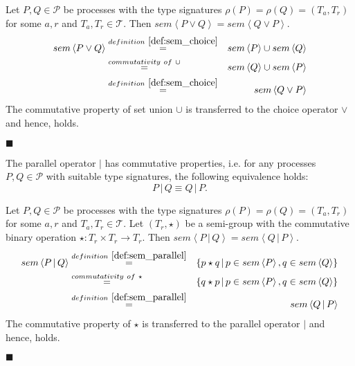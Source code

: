 \begin{myproof}
Let $P, Q \in \mathcal{P}$ be processes with the type signatures $\rho \left( P \right) = \rho \left( Q \right) = \left( T_a, T_r \right)$ for some $a, r$ and $T_a, T_r \in \mathcal{T}$. Then $sem \left\langle P \vee Q \right\rangle = sem \left\langle Q \vee P \right\rangle$.
\begin{eqnarray*}
  sem \left\langle P \vee Q \right\rangle & \overset{\defref{def:sem_choice}}{=} & sem \left\langle P \right\rangle \cup sem \left\langle Q \right\rangle \\
  & \overset{commutativity \ of \ \cup}{=} & sem \left\langle Q \right\rangle \cup sem \left\langle P \right\rangle \\
  & \overset{\defref{def:sem_choice}}{=} & sem \left\langle Q \vee P \right\rangle
\end{eqnarray*}
The commutative property of set union $\cup$ is transferred to the choice operator $\vee$ and hence,  holds.

\hfill$\blacksquare$
\end{myproof}

\begin{theorem}
\label{thm:commutativity_parallel}
The parallel operator $|$ has commutative properties, i.e. for any processes $P, Q \in \mathcal{P}$ with suitable type signatures, the following equivalence holds:
\begin{equation*}
  P \,|\, Q \equiv Q \,|\, P.
\end{equation*}
\end{theorem}

\begin{myproof}
Let $P, Q \in \mathcal{P}$ be processes with the type signatures $\rho \left( P \right) = \rho \left( Q \right) = \left( T_a, T_r \right)$ for some $a, r$ and $T_a, T_r \in \mathcal{T}$. Let $\left( T_r, \star \right)$ be a semi-group with the commutative binary operation $\star \colon T_r \times T_r \to T_r$. Then $sem \left\langle P \,|\, Q \right\rangle = sem \left\langle Q \,|\, P \right\rangle$.
\begin{eqnarray*}
  sem \left\langle P \,|\, Q \right\rangle & \overset{\defref{def:sem_parallel}}{=} & \left\{ p \star q \,|\, p \in sem \left\langle P \right\rangle, q \in sem \left\langle Q \right\rangle \right\} \\
  & \overset{commutativity \ of \ \star}{=} & \left\{ q \star p \,|\, p \in sem \left\langle P \right\rangle, q \in sem \left\langle Q \right\rangle \right\} \\
  & \overset{\defref{def:sem_parallel}}{=} & sem \left\langle Q \,|\, P \right\rangle
\end{eqnarray*}
The commutative property of $\star$ is transferred to the parallel operator $|$ and hence,  holds.

\hfill$\blacksquare$
\end{myproof}

